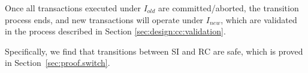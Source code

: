 Once all transactions executed under $I_{old}$ are committed/aborted, the transition process ends, and new transactions will operate under $I_{new}$, which are validated in the process described in Section \ref{sec:design:cc:validation}. 

{
\color{blue}
Specifically, we find that transitions between SI and RC are safe, which is proved in Section~\ref{sec:proof.switch}. 
}



